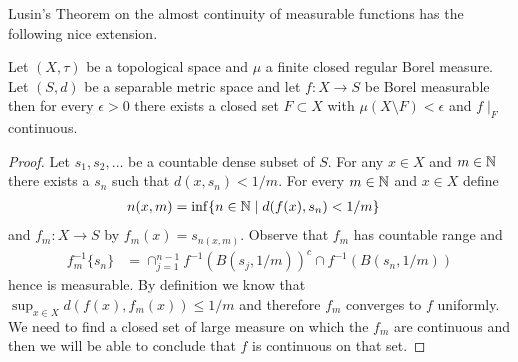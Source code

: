 Lusin's Theorem on the almost continuity of measurable functions has
the following nice extension.
\begin{thm}\label{ExtendedLusin} Let $(X, \tau)$ be a topological space and $\mu$ a finite closed regular
Borel measure.  Let $(S,d)$ be a separable metric space and let $f : X \to S$ be Borel measurable then for 
every $\epsilon > 0$ there exists a closed set $F \subset X$ with $\mu(X \setminus F) < \epsilon$ and 
$f \mid_F$ continuous.
\end{thm}
\begin{proof}
Let $s_1, s_2, \dotsc$ be a countable dense subset of $S$.  For any $x \in X$ and $m \in \mathbb{N}$ there exists a
$s_n$ such that $d(x,s_n) < 1/m$.  For every $m \in \mathbb{N}$ and $x \in X$ define 
\begin{align*}
n(x,m) &= \inf \lbrace n \in \mathbb{N} \mid d(f(x), s_n) < 1/m \rbrace
\end{align*}
and  $f_m : X \to S$ by $f_m(x) = s_{n(x,m)}$.  Observe that $f_m$ has countable range and 
\begin{align*}
f_m^{-1} \lbrace s_n \rbrace &= \cap_{j=1}^{n-1} f^{-1}(B(s_j, 1/m))^c \cap f^{-1}(B(s_n, 1/m))
\end{align*} 
hence is measurable.  
By definition we know that $\sup_{x \in X} d(f(x), f_m(x)) \leq 1/m$ and therefore
$f_m$ converges to $f$ uniformly.  We need to find a closed set of large measure on which the $f_m$ are continuous and then we will be 
able to conclude that $f$ is continuous on that set.  


\end{proof}
